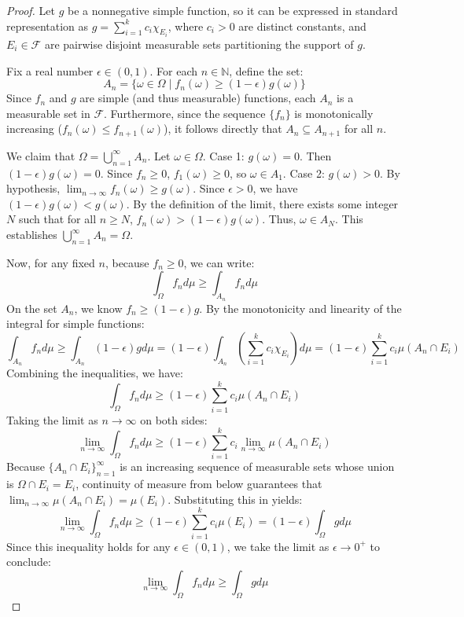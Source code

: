\documentclass[12pt]{article}
\begin{document}
\begin{proof}
Let $g$ be a nonnegative simple function, so it can be expressed in standard representation as $g = \sum_{i=1}^{k} c_i \chi_{E_i}$, where $c_i > 0$ are distinct constants, and $E_i \in \mathcal{F}$ are pairwise disjoint measurable sets partitioning the support of $g$. 

Fix a real number $\epsilon \in (0, 1)$. For each $n \in \mathbb{N}$, define the set:
$$ A_n = \{\omega \in \Omega \mid f_n(\omega) \ge (1 - \epsilon)g(\omega)\} $$
Since $f_n$ and $g$ are simple (and thus measurable) functions, each $A_n$ is a measurable set in $\mathcal{F}$. Furthermore, since the sequence $\{f_n\}$ is monotonically increasing ($f_n(\omega) \le f_{n+1}(\omega)$), it follows directly that $A_n \subseteq A_{n+1}$ for all $n$.

We claim that $\Omega = \bigcup_{n=1}^{\infty} A_n$. 
Let $\omega \in \Omega$. 
Case 1: $g(\omega) = 0$. Then $(1-\epsilon)g(\omega) = 0$. Since $f_n \ge 0$, $f_1(\omega) \ge 0$, so $\omega \in A_1$.
Case 2: $g(\omega) > 0$. By hypothesis, $\lim_{n \to \infty} f_n(\omega) \ge g(\omega)$. Since $\epsilon > 0$, we have $(1-\epsilon)g(\omega) < g(\omega)$. By the definition of the limit, there exists some integer $N$ such that for all $n \ge N$, $f_n(\omega) > (1-\epsilon)g(\omega)$. Thus, $\omega \in A_N$.
This establishes $\bigcup_{n=1}^{\infty} A_n = \Omega$.

Now, for any fixed $n$, because $f_n \ge 0$, we can write:
$$ \int_{\Omega} f_n d\mu \ge \int_{A_n} f_n d\mu $$
On the set $A_n$, we know $f_n \ge (1-\epsilon)g$. By the monotonicity and linearity of the integral for simple functions:
$$ \int_{A_n} f_n d\mu \ge \int_{A_n} (1-\epsilon)g d\mu = (1-\epsilon) \int_{A_n} \left( \sum_{i=1}^{k} c_i \chi_{E_i} \right) d\mu = (1-\epsilon) \sum_{i=1}^{k} c_i \mu(A_n \cap E_i) $$
Combining the inequalities, we have:
$$ \int_{\Omega} f_n d\mu \ge (1-\epsilon) \sum_{i=1}^{k} c_i \mu(A_n \cap E_i) $$
Taking the limit as $n \to \infty$ on both sides:
$$ \lim_{n \to \infty} \int_{\Omega} f_n d\mu \ge (1-\epsilon) \sum_{i=1}^{k} c_i \lim_{n \to \infty} \mu(A_n \cap E_i) $$
Because $\{A_n \cap E_i\}_{n=1}^{\infty}$ is an increasing sequence of measurable sets whose union is $\Omega \cap E_i = E_i$, continuity of measure from below guarantees that $\lim_{n \to \infty} \mu(A_n \cap E_i) = \mu(E_i)$. Substituting this in yields:
$$ \lim_{n \to \infty} \int_{\Omega} f_n d\mu \ge (1-\epsilon) \sum_{i=1}^{k} c_i \mu(E_i) = (1-\epsilon) \int_{\Omega} g d\mu $$
Since this inequality holds for any $\epsilon \in (0, 1)$, we take the limit as $\epsilon \to 0^+$ to conclude:
$$ \lim_{n \to \infty} \int_{\Omega} f_n d\mu \ge \int_{\Omega} g d\mu $$
\end{proof}
\end{document}
